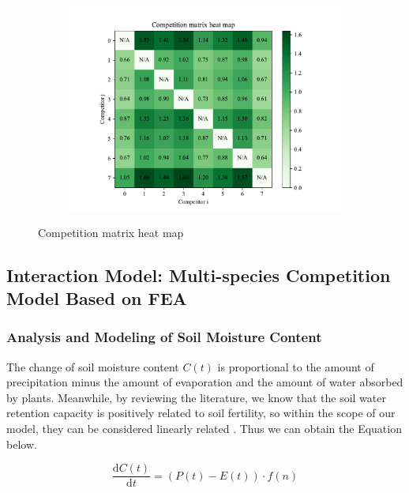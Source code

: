 \documentclass{mcmthesis}
\begin{document}
\begin{figure}[h]
\centering
\begin{subfigure}{0.548 \textwidth}
\includegraphics[width=1\textwidth]{img/competition matrix heat map}
\end{subfigure}
\caption{Competition matrix heat map}
\label{fig:heat}
\end{figure}

\subsection{Interaction Model: Multi-species Competition Model Based on FEA}

\subsubsection{Analysis and Modeling of Soil Moisture Content}

\indent

The change of soil moisture content $C(t)$ is proportional to the amount of precipitation minus the amount of evaporation and the amount of water absorbed by plants. Meanwhile, by reviewing the literature, we know that the soil water retention capacity is positively related to soil fertility, so within the scope of our model, they can be considered linearly related \cite{6}. Thus we can obtain the Equation below.

\begin{equation}
\frac{\mathrm{d} C(t)}{\mathrm{d} t}=(P(t)-E(t)) \cdot f(n)
\end{equation}
\end{document}
